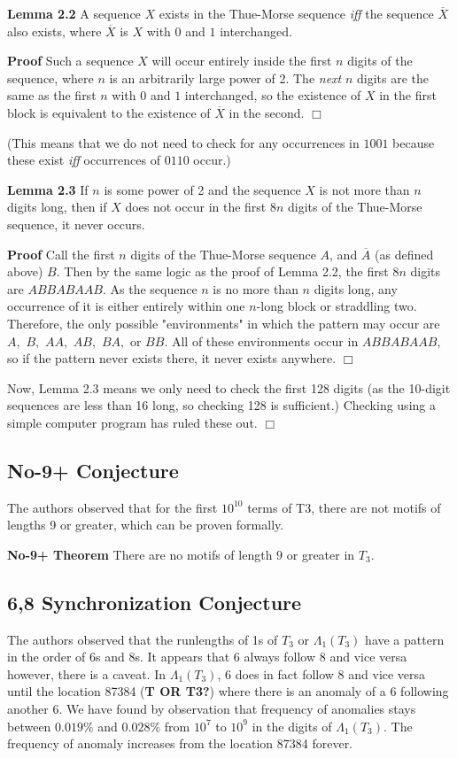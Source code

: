 \documentclass{article}
\begin{document}
\textbf{Lemma 2.2} A sequence $X$ exists in the Thue-Morse sequence \emph{iff} the sequence $\overline{X}$ also exists, where $\overline{X}$ is $X$ with $0$ and $1$ interchanged.

\textbf{Proof} Such a sequence $X$ will occur entirely inside the first $n$ digits of the sequence, where $n$ is an arbitrarily large power of 2. The \emph{next} $n$ digits are the same as the first $n$ with $0$ and $1$ interchanged, so the existence of $X$ in the first block is equivalent to the existence of $\overline{X}$ in the second. $\Box$

(This means that we do not need to check for any occurrences in $1001$ because these exist \emph{iff} occurrences of $0110$ occur.)

\textbf{Lemma 2.3} If $n$ is some power of 2 and the sequence $X$ is not more than $n$ digits long, then if $X$ does not occur in the first $8n$ digits of the Thue-Morse sequence, it never occurs.

\textbf{Proof} Call the first $n$ digits of the Thue-Morse sequence $A$, and $\overline{A}$ (as defined above) $B.$ Then by the same logic as the proof of Lemma 2.2, the first $8n$ digits are $ABBABAAB.$ As the sequence $n$ is no more than $n$ digits long, any occurrence of it is either entirely within one $n$-long block or straddling two. Therefore, the only possible "environments" in which the pattern may occur are $A,$ $B,$ $AA,$ $AB,$ $BA,$ or $BB.$ All of these environments occur in $ABBABAAB,$ so if the pattern never exists there, it never exists anywhere. $\Box$

Now, Lemma 2.3 means we only need to check the first 128 digits (as the 10-digit sequences are less than 16 long, so checking 128 is sufficient.) Checking using a simple computer program has ruled these out. $\Box$

\subsection{No-9+ Conjecture}
The authors observed that for the first $10^{10}$ terms of T3, there are not motifs of lengths 9 or greater, which can be proven formally.

\textbf{No-9+ Theorem} There are no motifs of length $9$ or greater in $T_3$.

\subsection{6,8 Synchronization Conjecture}
The authors observed that the runlengths of 1s of $T_3$ or $\Lambda{_1(T_3)}$ have a pattern in the order of 6s and 8s. It appears that 6 always follow 8 and vice versa however, there is a caveat. In $\Lambda{_1(T_3)}$, 6 does in fact follow 8 and vice versa until the location 87384 (\textbf{T OR T3?}) where there is an anomaly of a 6 following another 6. We have found by observation that frequency of anomalies stays between $0.019\%$ and $0.028\%$ from $10^7$ to $10^9$ in the digits of $\Lambda{_1(T_3)}$. The frequency of anomaly increases from the location 87384 forever.
\end{document}

